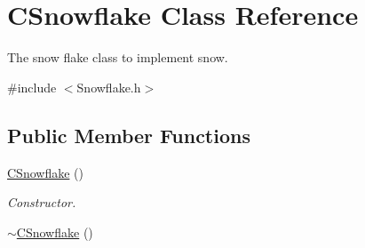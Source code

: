 \hypertarget{class_c_snowflake}{\section{C\+Snowflake Class Reference}
\label{class_c_snowflake}
}


The snow flake class to implement snow.  




{\ttfamily \#include $<$Snowflake.\+h$>$}

\subsection*{Public Member Functions}
\begin{DoxyCompactItemize}
\item 
\hypertarget{class_c_snowflake_a839815275ab5ca42c8545e39a04b2f75}{\hyperlink{class_c_snowflake_a839815275ab5ca42c8545e39a04b2f75}{C\+Snowflake} ()}\label{class_c_snowflake_a839815275ab5ca42c8545e39a04b2f75}

\begin{DoxyCompactList}\small\item\em Constructor. \end{DoxyCompactList}\item 
\hypertarget{class_c_snowflake_a0e8738c0d7fc9c2ab354e93532f62df2}{\hyperlink{class_c_snowflake_a0e8738c0d7fc9c2ab354e93532f62df2}{$\sim$\+C\+Snowflake} ()}\label{class_c_snowflake_a0e8738c0d7fc9c2ab354e93532f62df2}


\end{DoxyCompactItemize}
